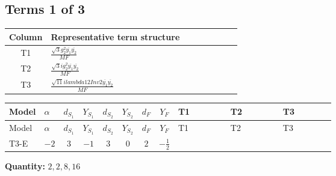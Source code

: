 \documentclass[8pt]{article}
\begin{document}
\begin{landscape}
\subsection*{Terms 1 of 3}
\begin{center}
\begin{tabular}{@{}c >{\raggedright\arraybackslash}p{0.82\linewidth}@{}}
\toprule
Column & Representative term structure \\
\midrule
T1 & \(\displaystyle \frac{\sqrt{3} g_{2}^{2} \overline{y_{1}} \overline{y_{2}}}{MF}\) \\
\midrule
T2 & \(\displaystyle \frac{\sqrt{3} i g_{2}^{2} \overline{y_{1}} \overline{y_{2}}}{MF}\) \\
\midrule
T3 & \(\displaystyle \frac{\sqrt{11} i lambda12Inv2 \overline{y_{1}} \overline{y_{2}}}{MF}\) \\
\midrule
\bottomrule
\end{tabular}
\end{center}
\smallskip
\tiny
\begin{longtable}{@{}llcccccc >{\raggedright\arraybackslash}p{0.21\linewidth} >{\raggedright\arraybackslash}p{0.21\linewidth} >{\raggedright\arraybackslash}p{0.21\linewidth}@{}}
\toprule
Model & $\alpha$ & $d_{S_1}$ & $Y_{S_1}$ & $d_{S_2}$ & $Y_{S_2}$ & $d_F$ & $Y_F$ & T1 & T2 & T3 \\
\midrule
\endfirsthead
\toprule
Model & $\alpha$ & $d_{S_1}$ & $Y_{S_1}$ & $d_{S_2}$ & $Y_{S_2}$ & $d_F$ & $Y_F$ & T1 & T2 & T3 \\
\midrule
\endhead
T3-E & $-2$ & $3$ & $-1$ & $3$ & $0$ & $2$ & $-\frac{1}{2}$ & \scriptsize\adjustbox{max width=\linewidth}{$\begin{gathered} \frac{\sqrt{3} g_{2}^{2} \overline{y_{1}} \overline{y_{2}}}{6 MF}\end{gathered}$} & \scriptsize\adjustbox{max width=\linewidth}{$\begin{gathered} - \frac{49 \sqrt{3} i g_{2}^{2} \overline{y_{1}} \overline{y_{2}}}{24 MF}\end{gathered}$} & \scriptsize\adjustbox{max width=\linewidth}{$\begin{gathered} - \frac{3 \sqrt{11} i lambda12Inv2 \overline{y_{1}} \overline{y_{2}}}{22 MF}\end{gathered}$} \\
\midrule
\bottomrule
\end{longtable}
\clearpage
\noindent\textbf{Quantity: }$\mathrm{2,2,8,16}$\par\smallskip

\end{landscape}
\end{document}
